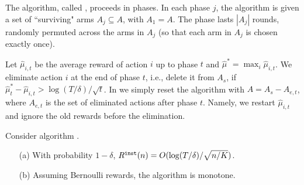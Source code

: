


The algorithm, called \SuccesiveEliminationReset, proceeds in phases. In each phase $j$, the algorithm is given a set of ``surviving" arms $A_j\subseteq A$, with $A_1=A$. The phase lasts $|A_j|$ rounds, randomly permuted across the arms in $A_j$ (so that each arm in $A_j$ is chosen exactly once). 



Let $\hat{\mu}_{i,t}$ be the average reward of action $i$ up
to phase $t$ and $\hat{\mu}^*=\max_i \hat{\mu}_{i,t}$. We eliminate
action $i$ at the end of phase $t$, i.e., delete it from $A_s$, if
$\hat{\mu}_t^*-\hat{\mu}_{i,t} > \log(T/\delta)/\sqrt{t}$.
In \SuccesiveEliminationReset we simply reset the algorithm with
$A=A_s-A_{e,t}$, where $A_{e,t}$ is the set of eliminated actions
after phase $t$. Namely, we restart $\hat{\mu}_{i,t}$ and ignore the
old rewards before the elimination.

\begin{lemma}
Consider algorithm \SuccesiveEliminationReset.
\begin{itemize}
\item[(a)]
With probability $1-\delta$, $R^{\mathtt{inst}}(n)=O(\log(T/\delta)/\sqrt{n/K})$.

\item[(b)]
Assuming Bernoulli rewards, the algorithm is monotone.
\end{itemize}
\end{lemma}

